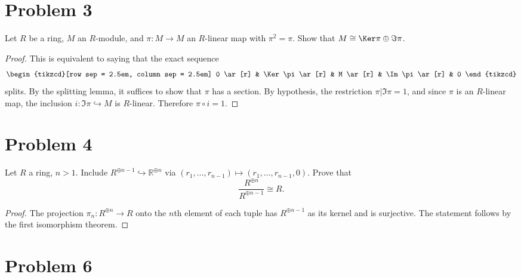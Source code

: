 \documentclass[11pt, letterpaper]{article}
\begin{document}
\section{Problem 3}
\begin{problem}
	Let $R$ be a ring, $M$ an $R$-module, and $\pi : M \to M$ an $R$-linear map with $\pi ^2=\pi $. Show that $M \cong \Ker \pi \oplus \Im \pi $.
\end{problem}
\begin{proof}
	This is equivalent to saying that the exact sequence
	\[\begin{tikzcd}[row sep = 2.5em, column sep = 2.5em]
	0 \ar[r]  & \Ker \pi \ar[r]  & M \ar[r]  & \Im \pi \ar[r]  & 0
	\end{tikzcd}\]
	splits. By the splitting lemma, it suffices to show that $\pi $ has a section. By hypothesis, the restriction $\pi |\Im \pi =1$, and since $\pi $ is an $R$-linear map, the inclusion $i:\Im \pi \hookrightarrow M$ is $R$-linear. Therefore $\pi \circ i=1$.
\end{proof}


\section{Problem 4}
\begin{problem}
	Let $R$ a ring, $n>1$. Include $R^{\oplus n-1} \hookrightarrow \mathbb{R} ^{\oplus n} $ via $(r_1, \ldots ,r_{n-1} )\mapsto (r_1, \ldots ,r_{n-1} ,0)$. Prove that
	\[
		\frac{R^{\oplus n} }{R^{\oplus n-1} } \cong R
	.\]
\end{problem}
\begin{proof}
	The projection $\pi _n : R^{\oplus n}\to R $ onto the $n$th element of each tuple has $R^{\oplus n-1} $ as its kernel and is surjective. The statement follows by the first isomorphism theorem.
\end{proof}

\section{Problem 6}
\end{document}
